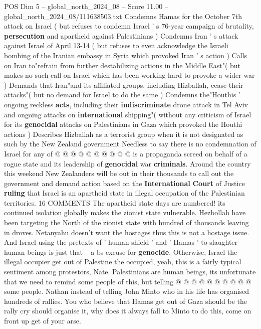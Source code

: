 \begin{textsample}{POS Dim 5 – global\_north\_2024\_08 – Score 11.00 – global\_north\_2024\_08/111638503.txt}  \label{ex:f5_pos_378}
Condemns Hamas for the October 7th attack on Israel ( but refuses to condemn Israel ' s 76-year campaign of brutality, \textbf{persecution} and apartheid against Palestinians ) Condemns Iran ' s attack against Israel of April 13-14 ( but refuses to even acknowledge the Israeli bombing of the Iranian embassy in Syria which provoked Iran ' s action ) Calls on Iran to"refrain from further destabilizing actions in the Middle East"( but makes no such call on Israel which has been working hard to provoke a wider war ) Demands that Iran"and its affiliated groups, including Hizballah, cease their attacks"( but no demand for Israel to do the same ) Condemns the"Houthis ' ongoing reckless \textbf{acts}, including their \textbf{indiscriminate} drone attack in Tel Aviv and ongoing attacks on \textbf{international} shipping"( without any criticism of Israel for its \textbf{genocidal} attacks on Palestinians in Gaza which provoked the Houthi actions ) Describes Hizballah as a terrorist group when it is not designated as such by the New Zealand government Needless to say there is no condemnation of Israel for any of @ @ @ @ @ @ @ @ @ @ is a propaganda screed on behalf of a rogue state and its leadership of \textbf{genocidal} war \textbf{criminals}.
Around the country this weekend New Zealanders will be out in their thousands to call out the government and demand action based on the \textbf{International} \textbf{Court} of Justice \textbf{ruling} that Israel is an apartheid state in illegal occupation of the Palestinian territories. 16 COMMENTS The apartheid state days are numbered! its continued isolation globally makes the zionist state vulnerable.
Hezbollah have been targeting the North of the zionist state with hundred of thousands leaving in droves.
Netanyahu doesn't want the hostages thus this is not a hostage issue.
And Israel using the pretexts of ' human shield ' and ' Hamas ' to slaughter human beings is just that -- a bs excuse for \textbf{genocide}.
Otherwise, Israel the illegal occupier get out of Palestine the occupied, yeah, this is a fairly typical sentiment among protestors, Nate.
Palestinians are human beings, its unfortunate that we need to remind some people of this, but telling @ @ @ @ @ @ @ @ @ @ some people.
Nathan instead of telling John Minto who in his life has organised hundreds of rallies.
You who believe that Hamas get out of Gaza should be the rally cry should organise it, why does it always fall to Minto to do this, come on front up get of your arse.

\end{textsample}
